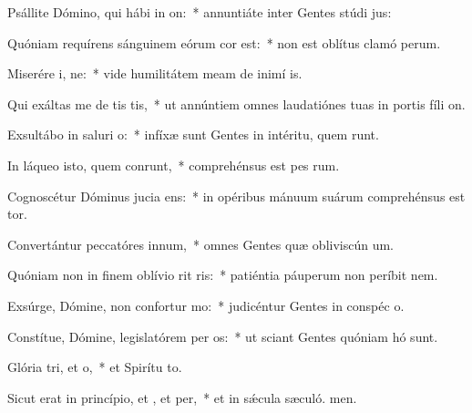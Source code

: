 \item Psállite Dómino, qui hábi in on:~* annuntiáte inter Gentes stúdi jus:
\item Quóniam requírens sánguinem eórum cor est:~* non est oblítus clamó perum.
\item Miserére i, ne:~* vide humilitátem meam de inimí is.
\item Qui exáltas me de tis tis,~* ut annúntiem omnes laudatiónes tuas in portis fíli on.
\item Exsultábo in saluri o:~* infíxæ sunt Gentes in intéritu, quem runt.
\item In láqueo isto, quem conrunt,~* comprehénsus est pes rum.
\item Cognoscétur Dóminus jucia ens:~* in opéribus mánuum suárum comprehénsus est tor.
\item Convertántur peccatóres  innum,~* omnes Gentes quæ obliviscún um.
\item Quóniam non in finem oblívio rit ris:~* patiéntia páuperum non períbit  nem.
\item Exsúrge, Dómine, non confortur mo:~* judicéntur Gentes in conspéc o.
\item Constítue, Dómine, legislatórem per os:~* ut sciant Gentes quóniam hó sunt.
\item Glória tri, et o,~* et Spirítu to.
\item Sicut erat in princípio, et , et per,~* et in sǽcula sæculó. men.
